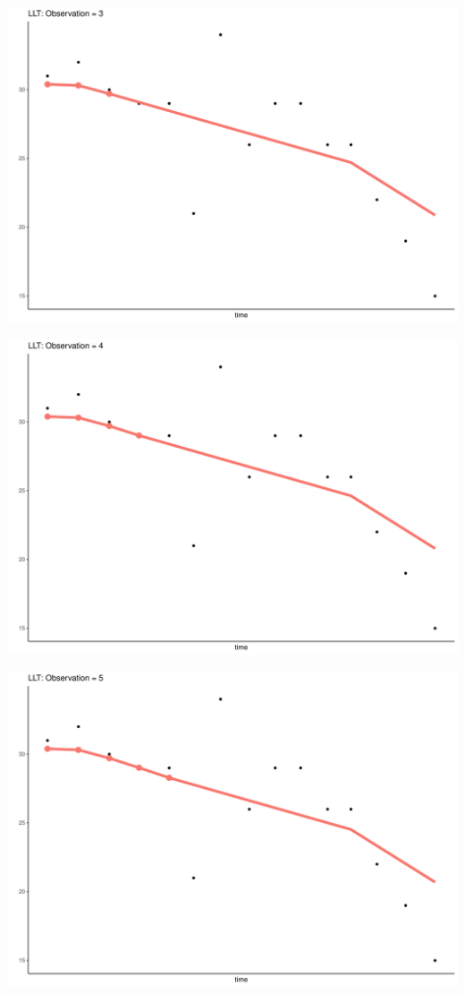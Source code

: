 \documentclass[
  ignorenonframetext,
]{beamer}
\begin{document}
\begin{frame}{}
\protect\hypertarget{section-32}{}
\includegraphics{Prez4_files/figure-beamer/unnamed-chunk-15-3.pdf}
\end{frame}

\begin{frame}{}
\protect\hypertarget{section-33}{}
\includegraphics{Prez4_files/figure-beamer/unnamed-chunk-15-4.pdf}
\end{frame}

\begin{frame}{}
\protect\hypertarget{section-34}{}
\includegraphics{Prez4_files/figure-beamer/unnamed-chunk-15-5.pdf}
\end{frame}
\end{document}
